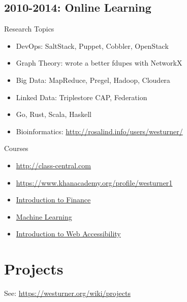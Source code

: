 \documentclass[letter,,openany,oneside]{sphinxhowto}
\begin{document}
\subsection{2010-2014: Online Learning}
\label{resume:nebraska-humane-society-nonprofit-consulting}\label{resume:online-learning}\label{resume:id2}
Research Topics
\begin{itemize}
\item {} 
DevOps: SaltStack, Puppet, Cobbler, OpenStack

\item {} 
Graph Theory: wrote a better fdupes with NetworkX

\item {} 
Big Data: MapReduce, Pregel, Hadoop, Cloudera

\item {} 
Linked Data: Triplestore CAP, Federation

\item {} 
Go, Rust, Scala, Haskell

\item {} 
Bioinformatics: \href{http://rosalind.info/users/westurner/}{http://rosalind.info/users/westurner/}

\end{itemize}

Courses
\begin{itemize}
\item {} 
\href{http://class-central.com}{http://class-central.com}

\item {} 
\href{https://www.khanacademy.org/profile/westurner1}{https://www.khanacademy.org/profile/westurner1}

\item {} 
\href{https://www.coursera.org/course/introfinance}{Introduction to Finance}

\item {} 
\href{https://www.coursera.org/course/ml}{Machine Learning}

\item {} 
\href{https://webaccessibility.withgoogle.com/course}{Introduction to Web Accessibility}

\end{itemize}


\section{Projects}
\label{resume:projects}
See: \href{https://westurner.org/wiki/projects}{https://westurner.org/wiki/projects}
\end{document}
